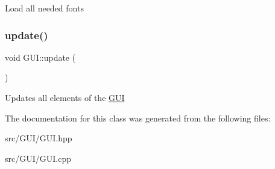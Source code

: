 Load all needed fonts \mbox{\label{class_g_u_i_a947e568bf884a8798e3e368417f662c7}} 
\subsubsection{\texorpdfstring{update()}{update()}}
{\footnotesize\ttfamily void G\+U\+I\+::update (\begin{DoxyParamCaption}{ }\end{DoxyParamCaption})}

Updates all elements of the \hyperlink{class_g_u_i}{G\+UI} 

The documentation for this class was generated from the following files\+:\begin{DoxyCompactItemize}
\item 
src/\+G\+U\+I/G\+U\+I.\+hpp\item 
src/\+G\+U\+I/G\+U\+I.\+cpp\end{DoxyCompactItemize}

